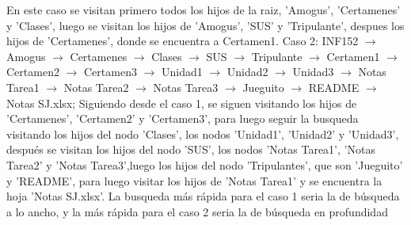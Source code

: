 \documentclass[letterpaper,10pt]{article}
\begin{document}
\begin{enumerate}
\begin{enumerate}
    \newline\newline
    En este caso se visitan primero todos los hijos de la raiz, 'Amogus', 'Certamenes' y 'Clases', luego se visitan los hijos de 'Amogus', 'SUS' y 'Tripulante', despues los hijos de 'Certamenes', donde se encuentra a Certamen1.
    \newline\newline
    Caso 2: INF152 $\rightarrow$ Amogus $\rightarrow$ Certamenes $\rightarrow$ Clases $\rightarrow$ SUS $\rightarrow$ Tripulante $\rightarrow$ Certamen1 $\rightarrow$ Certamen2 $\rightarrow$ Certamen3 $\rightarrow$ Unidad1 $\rightarrow$ Unidad2 $\rightarrow$ Unidad3 $\rightarrow$ Notas Tarea1 $\rightarrow$ Notas Tarea2 $\rightarrow$ Notas Tarea3 $\rightarrow$ Jueguito $\rightarrow$ README $\rightarrow$ Notas SJ.xlsx;
    \newline\newline
    Siguiendo desde el caso 1, se siguen visitando los hijos de 'Certamenes', 'Certamen2' y 'Certamen3', para luego seguir la busqueda visitando los hijos del nodo 'Clases', los nodos 'Unidad1', 'Unidad2' y 'Unidad3', después se visitan los hijos del nodo 'SUS', los nodos 'Notas Tarea1', 'Notas Tarea2' y 'Notas Tarea3',luego los hijos del nodo 'Tripulantes', que son 'Jueguito' y 'README', para luego visitar los hijos de 'Notas Tarea1' y se encuentra la hoja 'Notas SJ.xlsx'.
    \newline\newline
    La busqueda más rápida para el caso 1 seria la de búsqueda a lo ancho, y la más rápida para el caso 2 seria la de búsqueda en profundidad
\end{enumerate}


\end{enumerate}
\end{document}

